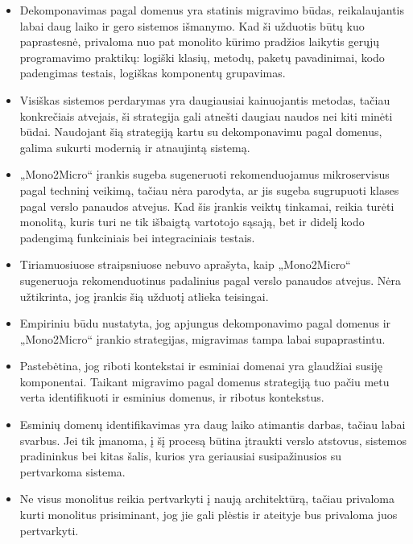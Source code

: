 \documentclass[fleqn]{VUMIFPSkursinis}
\begin{document}
\begin{itemize}
    
    \item Dekomponavimas pagal domenus yra statinis migravimo būdas, reikalaujantis labai daug laiko ir gero sistemos išmanymo. Kad ši užduotis būtų kuo paprastesnė, privaloma nuo pat monolito kūrimo pradžios laikytis gerųjų programavimo praktikų: logiški klasių, metodų, paketų pavadinimai, kodo padengimas testais, logiškas komponentų grupavimas.
    
    \item Visiškas sistemos perdarymas yra daugiausiai kainuojantis metodas, tačiau konkrečiais atvejais, ši strategija gali atnešti daugiau naudos nei kiti minėti būdai. Naudojant šią strategiją kartu su dekomponavimu pagal domenus, galima sukurti modernią ir atnaujintą sistemą.
    
    \item „Mono2Micro“ įrankis sugeba sugeneruoti rekomenduojamus mikroservisus pagal techninį veikimą, tačiau  nėra parodyta, ar jis sugeba sugrupuoti klases pagal verslo panaudos atvejus. Kad šis įrankis veiktų tinkamai, reikia turėti monolitą, kuris turi ne tik išbaigtą vartotojo sąsają, bet ir didelį kodo padengimą funkciniais bei integraciniais testais.
        
    \item Tiriamuosiuose straipsniuose nebuvo aprašyta, kaip „Mono2Micro“ sugeneruoja rekomenduotinus padalinius pagal verslo panaudos atvejus. Nėra užtikrinta, jog įrankis šią užduotį atlieka teisingai.
    
    \item Empiriniu būdu nustatyta, jog apjungus dekomponavimo pagal domenus ir „Mono2Micro“ įrankio strategijas, migravimas tampa labai supaprastintu.

    \item Pastebėtina, jog riboti kontekstai ir esminiai domenai yra glaudžiai susiję komponentai. Taikant migravimo pagal domenus strategiją tuo pačiu metu verta identifikuoti ir esminius domenus, ir ribotus kontekstus.
    
    \item Esminių domenų identifikavimas yra daug laiko atimantis darbas, tačiau labai svarbus. Jei tik įmanoma, į šį procesą būtina įtraukti verslo atstovus, sistemos pradininkus bei kitas šalis, kurios yra geriausiai susipažinusios su pertvarkoma sistema.

    \item Ne visus monolitus reikia pertvarkyti į naują architektūrą, tačiau privaloma kurti monolitus prisiminant, jog jie gali plėstis ir ateityje bus privaloma juos pertvarkyti.
    
\end{itemize}
\end{document}
